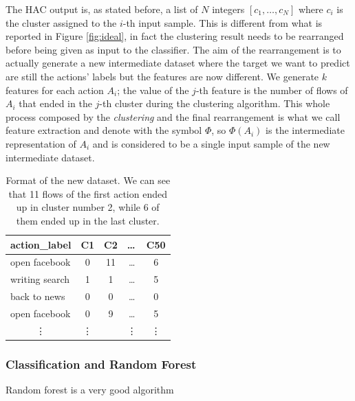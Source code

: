 The HAC output is, as stated before, a list of $N$ integers $[c_1,\dots, c_N]$ where $c_i$ is the cluster assigned to the $i$-th input sample. This is different from what is reported in Figure \ref{fig:ideal}, in fact the clustering result needs to be rearranged before being given as input to the classifier. The aim of the rearrangement is to actually generate a new intermediate dataset where the target we want to predict are still the actions' labels but the features are now different. We generate $k$ features for each action $A_i$; the value of the $j$-th feature is the number of flows of $A_i$ that ended in the $j$-th cluster during the clustering algorithm. This whole process composed by the \textit{clustering} and the final rearrangement is what we call feature extraction and denote with the symbol $\Phi$, so $\Phi(A_i)$ is the intermediate representation of $A_i$ and is considered to be a single input sample of the new intermediate dataset.

\begin{table}[]
\label{tab:newdataset}
\centering
\begin{tabular}{@{}lcccc@{}}
\toprule
\textbf{action\_label}     & \multicolumn{1}{l}{\textbf{C1}} & \multicolumn{1}{l}{\textbf{C2}} & \multicolumn{1}{l}{\textbf{\dots}} & \multicolumn{1}{l}{\textbf{C50}} \\ \midrule
open facebook              & 0                               & 11                              & \dots                              & 6                                \\
writing search             & 1                               & 1                               & \dots                              & 5                                \\
back to news               & 0                               & 0                               & \dots                              & 0                                \\
open facebook              & 0                               & 9                               & \dots                              & 5                                \\
\multicolumn{1}{c}{\vdots} & \vdots                          &                                 & \vdots                             & \vdots                           \\ \bottomrule
\end{tabular}
\caption{\small{Format of the new dataset. We can see that 11 flows of the first action ended up in cluster number 2, while 6 of them ended up in the last cluster.}}
\end{table}

\subsubsection{Classification and Random Forest}
Random forest is a very good algorithm
